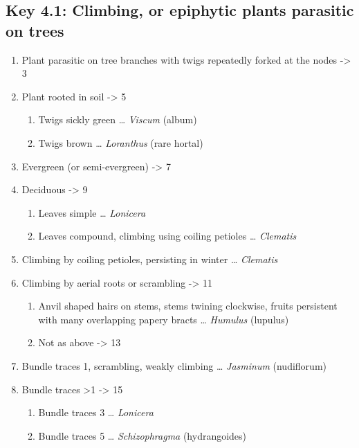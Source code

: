 \documentclass[openany]{book}
\providecommand{\tightlist}{%
  \setlength{\itemsep}{0pt}\setlength{\parskip}{0pt}}
\begin{document}
\hypertarget{key-4.1-climbing-or-epiphytic-plants-parasitic-on-trees-1}{%
\subsection{Key 4.1: Climbing, or epiphytic plants parasitic on
trees}\label{key-4.1-climbing-or-epiphytic-plants-parasitic-on-trees-1}}

\begin{enumerate}
\def\labelenumi{\arabic{enumi}.}
\tightlist
\item
  Plant parasitic on tree branches with twigs repeatedly forked at the
  nodes -\textgreater{} 3
\item
  Plant rooted in soil -\textgreater{} 5

  \begin{enumerate}
  \def\labelenumii{\arabic{enumii}.}
  \setcounter{enumii}{2}
  \tightlist
  \item
    Twigs sickly green \ldots{} \emph{Viscum} (album)
  \item
    Twigs brown \ldots{} \emph{Loranthus} (rare hortal)
  \end{enumerate}
\item
  Evergreen (or semi-evergreen) -\textgreater{} 7
\item
  Deciduous -\textgreater{} 9

  \begin{enumerate}
  \def\labelenumii{\arabic{enumii}.}
  \setcounter{enumii}{6}
  \tightlist
  \item
    Leaves simple \ldots{} \emph{Lonicera}
  \item
    Leaves compound, climbing using coiling petioles \ldots{}
    \emph{Clematis}
  \end{enumerate}
\item
  Climbing by coiling petioles, persisting in winter \ldots{}
  \emph{Clematis}
\item
  Climbing by aerial roots or scrambling -\textgreater{} 11

  \begin{enumerate}
  \def\labelenumii{\arabic{enumii}.}
  \setcounter{enumii}{10}
  \tightlist
  \item
    Anvil shaped hairs on stems, stems twining clockwise, fruits
    persistent with many overlapping papery bracts \ldots{}
    \emph{Humulus} (lupulus)
  \item
    Not as above -\textgreater{} 13
  \end{enumerate}
\item
  Bundle traces 1, scrambling, weakly climbing \ldots{} \emph{Jasminum}
  (nudiflorum)
\item
  Bundle traces \textgreater{}1 -\textgreater{} 15

  \begin{enumerate}
  \def\labelenumii{\arabic{enumii}.}
  \setcounter{enumii}{14}
  \tightlist
  \item
    Bundle traces 3 \ldots{} \emph{Lonicera}
  \item
    Bundle traces 5 \ldots{} \emph{Schizophragma} (hydrangoides)
  \end{enumerate}
\end{enumerate}
\end{document}
